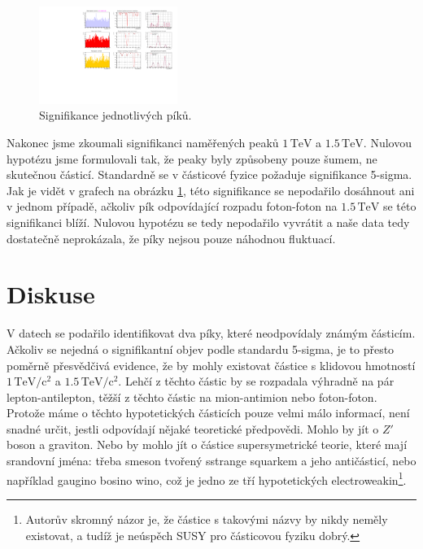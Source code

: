 \documentclass[10pt,a4paper]{article}
\renewcommand{\U}[1]{\ensuremath{\,\mathrm{#1}}}
\newcommand{\°}{\degree}
\begin{document}
\pagebreak

\begin{figure}
    \centering
    \includegraphics[width=0.4\textwidth]{c4_signif.pdf}
    \vspace{-2\baselineskip}
    \caption{Signifikance jednotlivých píků.}
    \label{obr:signif}
    \vspace{-5cm}
\end{figure}


Nakonec jsme zkoumali signifikanci naměřených peaků $1 \U{TeV}$ a $1.5 \U{TeV}$. Nulovou hypotézu jsme formulovali tak, že peaky byly způsobeny pouze šumem, ne skutečnou částicí. Standardně se v částicové fyzice požaduje signifikance 5-sigma. Jak je vidět v grafech na obrázku \ref{obr:signif}, této signifikance se nepodařilo dosáhnout ani v jednom případě, ačkoliv pík odpovídající rozpadu foton-foton na $1.5 \U{TeV}$ se této signifikanci blíží. Nulovou hypotézu se tedy nepodařilo vyvrátit a naše data tedy dostatečně neprokázala, že píky nejsou pouze náhodnou fluktuací.


\section{Diskuse}
V datech se podařilo identifikovat dva píky, které neodpovídaly známým částicím. Ačkoliv se nejedná o signifikantní objev podle standardu 5-sigma, je to přesto poměrně přesvědčivá evidence, že by mohly existovat částice s klidovou hmotností $1 \U{TeV/c^2}$ a $1.5 \U{TeV/c^2}$. Lehčí z těchto částic by se rozpadala výhradně na pár lepton-antilepton, těžší z těchto částic na mion-antimion nebo foton-foton. Protože máme o těchto hypotetických částicích pouze velmi málo informací, není snadné určit, jestli odpovídají nějaké teoretické předpovědi. Mohlo by jít o $Z'$ boson a graviton. Nebo by mohlo jít o částice supersymetrické teorie, které mají srandovní jména: třeba smeson tvořený sstrange squarkem a jeho antičásticí, nebo například gaugino bosino wino, což je jedno ze tří hypotetických electroweakin\footnote{Autorův skromný názor je, že částice s takovými názvy by nikdy neměly existovat, a tudíž je neúspěch SUSY pro částicovou fyziku dobrý.}.
\end{document}

